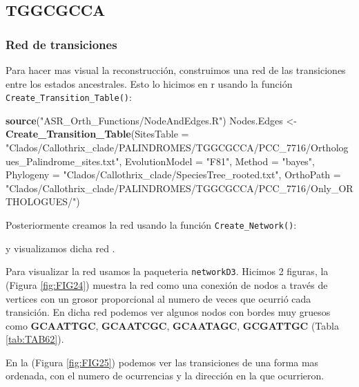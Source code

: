 \documentclass[
]{book}
\newenvironment{Shaded}{\begin{snugshade}}{\end{snugshade}}
\newcommand{\AttributeTok}[1]{\textcolor[rgb]{0.13,0.29,0.53}{#1}}
\newcommand{\FunctionTok}[1]{\textcolor[rgb]{0.13,0.29,0.53}{\textbf{#1}}}
\newcommand{\NormalTok}[1]{#1}
\newcommand{\OtherTok}[1]{\textcolor[rgb]{0.56,0.35,0.01}{#1}}
\newcommand{\StringTok}[1]{\textcolor[rgb]{0.31,0.60,0.02}{#1}}
\begin{document}
\hypertarget{tggcgcca}{%
\subsection{TGGCGCCA}\label{tggcgcca}}

\hypertarget{red-de-transiciones-4}{%
\subsubsection{Red de transiciones}\label{red-de-transiciones-4}}

Para hacer mas visual la reconstrucción, construimos una red de las transiciones entre los estados ancestrales. Esto lo hicimos en r usando la función \texttt{Create\_Transition\_Table()}:

\begin{Shaded}
\begin{Highlighting}[]
\FunctionTok{source}\NormalTok{(}\StringTok{"ASR\_Orth\_Functions/NodeAndEdges.R"}\NormalTok{)}
\NormalTok{Nodes.Edges }\OtherTok{\textless{}{-}} \FunctionTok{Create\_Transition\_Table}\NormalTok{(}\AttributeTok{SitesTable =} \StringTok{"Clados/Callothrix\_clade/PALINDROMES/TGGCGCCA/PCC\_7716/Orthologues\_Palindrome\_sites.txt"}\NormalTok{,}
                                \AttributeTok{EvolutionModel =} \StringTok{"F81"}\NormalTok{,}
                                \AttributeTok{Method =} \StringTok{"bayes"}\NormalTok{,}
                                \AttributeTok{Phylogeny =} \StringTok{"Clados/Callothrix\_clade/SpeciesTree\_rooted.txt"}\NormalTok{,}
                                \AttributeTok{OrthoPath =} \StringTok{"Clados/Callothrix\_clade/PALINDROMES/TGGCGCCA/PCC\_7716/Only\_ORTHOLOGUES/"}\NormalTok{)}
\end{Highlighting}
\end{Shaded}

Posteriormente creamos la red usando la función \texttt{Create\_Network()}:

y visualizamos dicha red .

Para visualizar la red usamos la paqueteria \texttt{networkD3}. Hicimos 2 figuras, la (Figura \ref{fig:FIG24}) muestra la red como una conexión de nodos a través de vertices con un grosor proporcional al numero de veces que ocurrió cada transición. En dicha red podemos ver algunos nodos con bordes muy gruesos como \textbf{GCAATTGC}, \textbf{GCAATCGC}, \textbf{GCAATAGC}, \textbf{GCGATTGC} (Tabla \ref{tab:TAB62}).

En la (Figura \ref{fig:FIG25}) podemos ver las transiciones de una forma mas ordenada, con el numero de ocurrencias y la dirección en la que ocurrieron.
\end{document}
